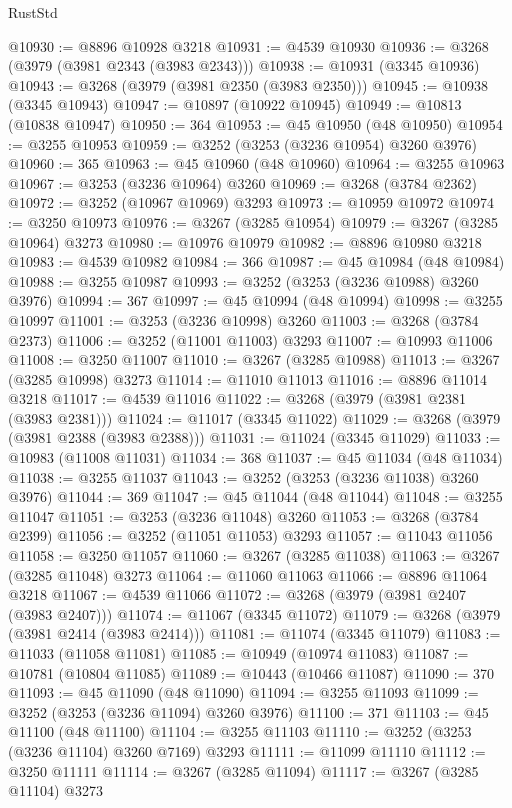 \begin{lexlean}{RustStd}
\begin{coremodule}
{\begin{coremodule}
{{{{{{{{{{{{{{{{{{{{{{{{{{{{{{{{{{{{{{{@10930 := @8896 @10928 @3218
@10931 := @4539 @10930
@10936 := @3268 (@3979 (@3981 @2343 (@3983 @2343)))
@10938 := @10931 (@3345 @10936)
@10943 := @3268 (@3979 (@3981 @2350 (@3983 @2350)))
@10945 := @10938 (@3345 @10943)
@10947 := @10897 (@10922 @10945)
@10949 := @10813 (@10838 @10947)
@10950 := 364
@10953 := @45 @10950 (@48 @10950)
@10954 := @3255 @10953
@10959 := @3252 (@3253 (@3236 @10954) @3260 @3976)
@10960 := 365
@10963 := @45 @10960 (@48 @10960)
@10964 := @3255 @10963
@10967 := @3253 (@3236 @10964) @3260
@10969 := @3268 (@3784 @2362)
@10972 := @3252 (@10967 @10969) @3293
@10973 := @10959 @10972
@10974 := @3250 @10973
@10976 := @3267 (@3285 @10954)
@10979 := @3267 (@3285 @10964) @3273
@10980 := @10976 @10979
@10982 := @8896 @10980 @3218
@10983 := @4539 @10982
@10984 := 366
@10987 := @45 @10984 (@48 @10984)
@10988 := @3255 @10987
@10993 := @3252 (@3253 (@3236 @10988) @3260 @3976)
@10994 := 367
@10997 := @45 @10994 (@48 @10994)
@10998 := @3255 @10997
@11001 := @3253 (@3236 @10998) @3260
@11003 := @3268 (@3784 @2373)
@11006 := @3252 (@11001 @11003) @3293
@11007 := @10993 @11006
@11008 := @3250 @11007
@11010 := @3267 (@3285 @10988)
@11013 := @3267 (@3285 @10998) @3273
@11014 := @11010 @11013
@11016 := @8896 @11014 @3218
@11017 := @4539 @11016
@11022 := @3268 (@3979 (@3981 @2381 (@3983 @2381)))
@11024 := @11017 (@3345 @11022)
@11029 := @3268 (@3979 (@3981 @2388 (@3983 @2388)))
@11031 := @11024 (@3345 @11029)
@11033 := @10983 (@11008 @11031)
@11034 := 368
@11037 := @45 @11034 (@48 @11034)
@11038 := @3255 @11037
@11043 := @3252 (@3253 (@3236 @11038) @3260 @3976)
@11044 := 369
@11047 := @45 @11044 (@48 @11044)
@11048 := @3255 @11047
@11051 := @3253 (@3236 @11048) @3260
@11053 := @3268 (@3784 @2399)
@11056 := @3252 (@11051 @11053) @3293
@11057 := @11043 @11056
@11058 := @3250 @11057
@11060 := @3267 (@3285 @11038)
@11063 := @3267 (@3285 @11048) @3273
@11064 := @11060 @11063
@11066 := @8896 @11064 @3218
@11067 := @4539 @11066
@11072 := @3268 (@3979 (@3981 @2407 (@3983 @2407)))
@11074 := @11067 (@3345 @11072)
@11079 := @3268 (@3979 (@3981 @2414 (@3983 @2414)))
@11081 := @11074 (@3345 @11079)
@11083 := @11033 (@11058 @11081)
@11085 := @10949 (@10974 @11083)
@11087 := @10781 (@10804 @11085)
@11089 := @10443 (@10466 @11087)
@11090 := 370
@11093 := @45 @11090 (@48 @11090)
@11094 := @3255 @11093
@11099 := @3252 (@3253 (@3236 @11094) @3260 @3976)
@11100 := 371
@11103 := @45 @11100 (@48 @11100)
@11104 := @3255 @11103
@11110 := @3252 (@3253 (@3236 @11104) @3260 @7169) @3293
@11111 := @11099 @11110
@11112 := @3250 @11111
@11114 := @3267 (@3285 @11094)
@11117 := @3267 (@3285 @11104) @3273
}}}}}}}}}}}}}}}}}}}}}}}}}}}}}}}}}}}}}}}
\end{coremodule}}
\end{coremodule}
\end{lexlean}
